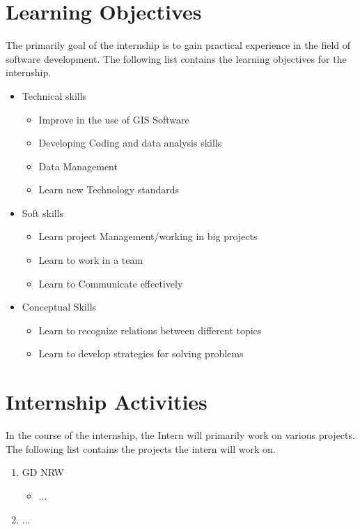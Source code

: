 \documentclass{article}
\begin{document}
\section{Learning Objectives}
The primarily goal of the internship is to gain practical experience in the field of software development. The following list contains the learning objectives for the internship. 
\begin{itemize}
\item Technical skills
\begin{itemize}
    \item Improve in the use of GIS Software
    \item Developing Coding and data analysis skills
    \item Data Management
    \item Learn new Technology standards
\end{itemize}
\item Soft skills
\begin{itemize}
    \item Learn project Management/working in big projects
    \item Learn to work in a team
    \item Learn to Communicate effectively
\end{itemize}
\item Conceptual Skills
\begin{itemize}
    \item Learn to recognize relations between different topics
    \item Learn to develop strategies for solving problems
\end{itemize}
\end{itemize}

\section{Internship Activities}
In the course of the internship, the Intern will primarily work on various projects. The following list contains the projects the intern will work on.

\begin{enumerate}
    \item GD NRW
    \begin{itemize}
        \item ...
    \end{itemize}
    \item ... 
    \end{enumerate}
\end{document}
